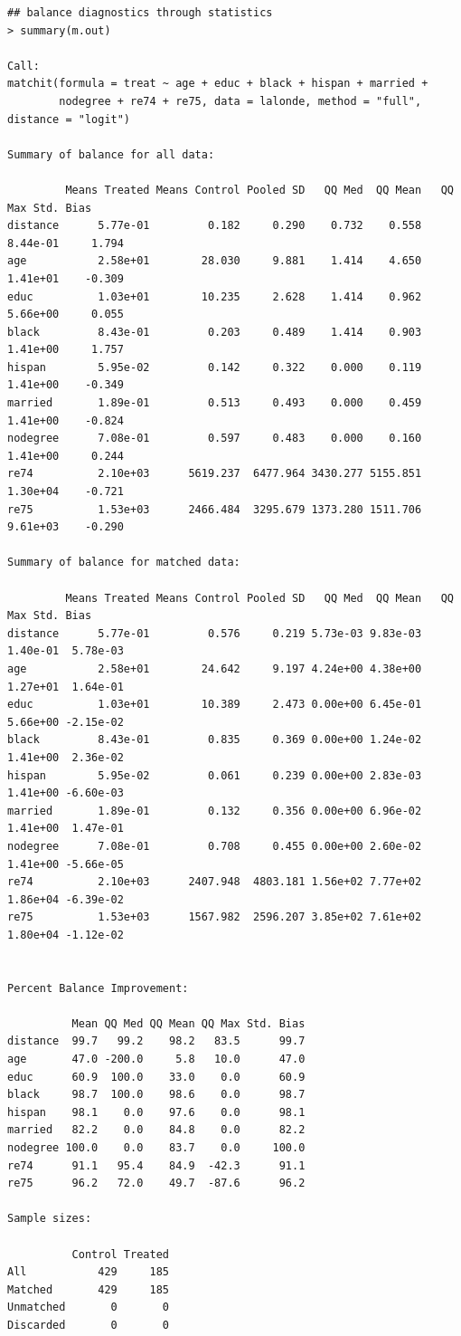 \documentclass[oneside,letterpaper,titlepage]{article}
\begin{document}
\begin{verbatim}
## balance diagnostics through statistics
> summary(m.out)

Call: 
matchit(formula = treat ~ age + educ + black + hispan + married +   
        nodegree + re74 + re75, data = lalonde, method = "full", distance = "logit")

Summary of balance for all data:

         Means Treated Means Control Pooled SD   QQ Med  QQ Mean   QQ Max Std. Bias
distance      5.77e-01         0.182     0.290    0.732    0.558 8.44e-01     1.794
age           2.58e+01        28.030     9.881    1.414    4.650 1.41e+01    -0.309
educ          1.03e+01        10.235     2.628    1.414    0.962 5.66e+00     0.055
black         8.43e-01         0.203     0.489    1.414    0.903 1.41e+00     1.757
hispan        5.95e-02         0.142     0.322    0.000    0.119 1.41e+00    -0.349
married       1.89e-01         0.513     0.493    0.000    0.459 1.41e+00    -0.824
nodegree      7.08e-01         0.597     0.483    0.000    0.160 1.41e+00     0.244
re74          2.10e+03      5619.237  6477.964 3430.277 5155.851 1.30e+04    -0.721
re75          1.53e+03      2466.484  3295.679 1373.280 1511.706 9.61e+03    -0.290

Summary of balance for matched data:

         Means Treated Means Control Pooled SD   QQ Med  QQ Mean   QQ Max Std. Bias
distance      5.77e-01         0.576     0.219 5.73e-03 9.83e-03 1.40e-01  5.78e-03
age           2.58e+01        24.642     9.197 4.24e+00 4.38e+00 1.27e+01  1.64e-01
educ          1.03e+01        10.389     2.473 0.00e+00 6.45e-01 5.66e+00 -2.15e-02
black         8.43e-01         0.835     0.369 0.00e+00 1.24e-02 1.41e+00  2.36e-02
hispan        5.95e-02         0.061     0.239 0.00e+00 2.83e-03 1.41e+00 -6.60e-03
married       1.89e-01         0.132     0.356 0.00e+00 6.96e-02 1.41e+00  1.47e-01
nodegree      7.08e-01         0.708     0.455 0.00e+00 2.60e-02 1.41e+00 -5.66e-05
re74          2.10e+03      2407.948  4803.181 1.56e+02 7.77e+02 1.86e+04 -6.39e-02
re75          1.53e+03      1567.982  2596.207 3.85e+02 7.61e+02 1.80e+04 -1.12e-02
        

Percent Balance Improvement:

          Mean QQ Med QQ Mean QQ Max Std. Bias
distance  99.7   99.2    98.2   83.5      99.7
age       47.0 -200.0     5.8   10.0      47.0
educ      60.9  100.0    33.0    0.0      60.9
black     98.7  100.0    98.6    0.0      98.7
hispan    98.1    0.0    97.6    0.0      98.1
married   82.2    0.0    84.8    0.0      82.2
nodegree 100.0    0.0    83.7    0.0     100.0
re74      91.1   95.4    84.9  -42.3      91.1
re75      96.2   72.0    49.7  -87.6      96.2

Sample sizes:

          Control Treated
All           429     185
Matched       429     185
Unmatched       0       0
Discarded       0       0
\end{verbatim}
\end{document}
